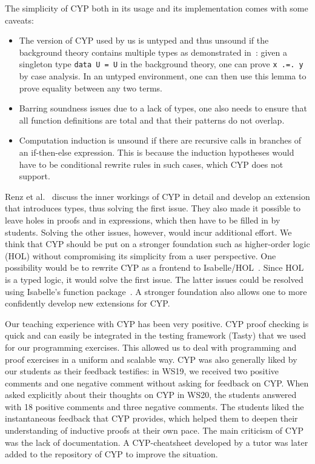 The simplicity of CYP both in its usage and its implementation comes with some caveats:
\begin{itemize}
    \item The version of CYP used by us is untyped and thus unsound if the background theory contains multiple types as demonstrated in~\cite{cyp_holes}: given a singleton type \lstinline[style=cyp]!data U = U! in the background theory,
      one can prove \lstinline[style=cyp]!x .=. y! by case analysis.
        In an untyped environment, one can then use this lemma to prove equality between any two terms.
    \item Barring soundness issues due to a lack of types, one also needs to ensure that all function definitions are total and that their patterns do not overlap.
    \item Computation induction is unsound if there are recursive calls in branches of an if-then-else expression.
      This is because the induction hypotheses would have to be conditional rewrite rules in such cases, which CYP does not support.
\end{itemize}
Renz et al.~\cite{cyp_holes} discuss the inner workings of CYP in detail and develop an extension that introduces types,
thus solving the first issue.
They also made it possible to leave holes in proofs and in expressions, which then have to be filled in by students.
Solving the other issues, however, would incur additional effort.
We think that CYP should be put on a stronger foundation such as higher-order logic (HOL) without compromising its simplicity from a user perspective.
One possibility would be to rewrite CYP as a frontend to Isabelle/HOL~\cite{isabelle}.
Since HOL is a typed logic, it would solve the first issue.
The latter issues could be resolved using Isabelle's function package~\cite{isabelle_functions}.
A stronger foundation also allows one to more confidently develop new extensions for CYP.

Our teaching experience with CYP has been very positive.
CYP proof checking is quick and can easily be integrated in the testing framework (Tasty) that we used for our programming exercises.
This allowed us to deal with programming and proof exercises in a uniform and scalable way.
CYP was also generally liked by our students as their feedback testifies:
in WS19,
we received two positive comments and one negative comment without asking for feedback on CYP.
When asked explicitly about their thoughts on CYP in WS20,
the students answered with 18 positive comments and three negative comments.
The students liked the instantaneous feedback that CYP provides,
which helped them to deepen their understanding of inductive proofs at their own pace.
The main criticism of CYP was the lack of documentation.
A CYP-cheatsheet developed by a tutor was later added to the repository of CYP to improve the situation.


